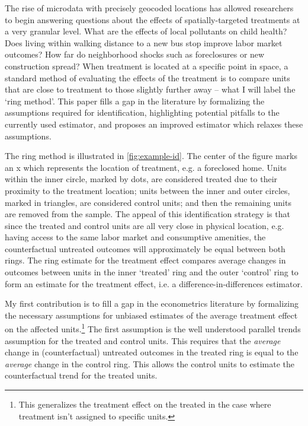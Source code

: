 \documentclass[10pt]{article}
\begin{document}
The rise of microdata with precisely geocoded locations has allowed researchers to begin answering questions about the effects of spatially-targeted treatments at a very granular level. What are the effects of local pollutants on child health? Does living within walking distance to a new bus stop improve labor market outcomes? How far do neighborhood shocks such as foreclosures or new construction spread? When treatment is located at a specific point in space, a standard method of evaluating the effects of the treatment is to compare units that are close to treatment to those slightly further away -- what I will label the `ring method'. This paper fills a gap in the literature by formalizing the assumptions required for identification, highlighting potential pitfalls to the currently used estimator, and proposes an improved estimator which relaxes these assumptions. 

The ring method is illustrated in \autoref{fig:example-id}. The center of the figure marks an x which represents the location of treatment, e.g. a foreclosed home. Units within the inner circle, marked by dots, are considered treated due to their proximity to the treatment location; units between the inner and outer circles, marked in triangles, are considered control units; and then the remaining units are removed from the sample. The appeal of this identification strategy is that since the treated and control units are all very close in physical location, e.g. having access to the same labor market and consumptive amenities, the counterfactual untreated outcomes will approximately be equal between both rings. The ring estimate for the treatment effect compares average changes in outcomes between units in the inner `treated' ring and the outer `control' ring to form an estimate for the treatment effect, i.e. a difference-in-differences estimator. 

My first contribution is to fill a gap in the econometrics literature by formalizing the necessary assumptions for unbiased estimates of the average treatment effect on the affected units.\footnote{This generalizes the treatment effect on the treated in the case where treatment isn't assigned to specific units.} The first assumption is the well understood parallel trends assumption for the treated and control units. This requires that the \emph{average} change in (counterfactual) untreated outcomes in the treated ring is equal to the \emph{average} change in the control ring. This allows the control units to estimate the counterfactual trend for the treated units. 
\end{document}
